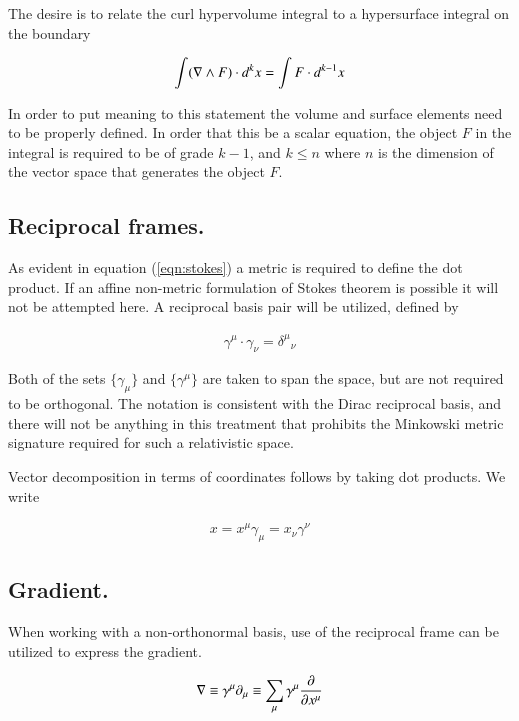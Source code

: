 The desire is to relate the curl hypervolume integral to a hypersurface integral on the boundary

\begin{align}\label{eqn:stokes}
\int (\nabla \wedge F) \cdot d^k x = \int F \cdot d^{k-1} x
\end{align}

In order to put meaning to this statement the volume and surface elements need to be properly defined.  In order that this be a scalar equation, the object $F$ in the integral is required to be of grade $k-1$, and $k \le n$ where $n$ is the dimension of the vector space that generates the object $F$.

\subsection{Reciprocal frames.}

As evident in equation (\ref{eqn:stokes}) a metric is required to define the dot product.  If an affine non-metric formulation
of Stokes theorem is possible it will not be attempted here.  A reciprocal basis pair will be utilized, defined by

\begin{align}
\gamma^\mu \cdot \gamma_\nu = {\delta^\mu}_\nu
\end{align}

Both of the sets $\{\gamma_\mu\}$ and $\{\gamma^\mu\}$ are taken to span the space, but are not required to be orthogonal.  The notation is consistent with the Dirac reciprocal basis, and there will not be anything in this treatment that prohibits the Minkowski metric signature required for such a relativistic space.

Vector decomposition in terms of coordinates follows by taking dot products.  We write

\begin{align}
x = x^\mu \gamma_\mu = x_\nu \gamma^\nu
\end{align}

\subsection{Gradient.}

When working with a non-orthonormal basis, use of the reciprocal frame can be utilized to express the gradient.

\begin{align}
\nabla \equiv \gamma^\mu \partial_\mu \equiv \sum_\mu \gamma^\mu \frac{\partial {}}{\partial {x^\mu}}
\end{align}

